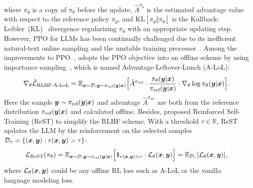 \documentclass{article}
\theoremstyle{plain}
\theoremstyle{definition}
\theoremstyle{remark}
\begin{document}
where $\pi_{\bar{\theta}}$ is a copy of $\pi_\theta$ before the update, $\hat{A}^{\pi_{\bar{\theta}}}$ is the estimated advantage value~\citep{schulman2015high} with respect to the reference policy $\pi_{\bar{\theta}}$, and $\text{KL}[\pi_{\bar{\theta}}\Vert \pi_{\theta}]$ is the Kullback-Leibler~(KL)~\citep{kullback1997information} divergence regularizing $\pi_\theta$ with an appropriate updating step.
However,  PPO for LLMs has been continually challenged due to its inefficient natural-text online sampling and the unstable training processes~\citep{baheti2023improving}. Among the improvements to PPO~\citep{rafailov2023direct,yuan2023rrhf,dong2023raft}, \citet{baheti2023improving} adopts the PPO objective into an offline scheme by using importance sampling~\citep{neal2001annealed}, which is named Advantage-Leftover-Lunch (A-LoL): 
\begin{equation}
  \nabla_\theta \hat{{\mathcal{L}}}_\text{RLHF-A-LoL} =   {\mathbb{E}}_{{\bm{x}} \sim{\mathcal{D}}, {\bm{y}}\sim \pi_\text{ref}({\bm{y}}|{\bm{x}})} \Big[
    \hat{A}^{\pi_\text{ref}}\cdot \frac{\pi_\theta({\bm{y}}|{\bm{x}})}{\pi_\text{ref}({\bm{y}}|{\bm{x}})} \cdot \nabla_\theta \log  \pi_\theta({\bm{y}}|{\bm{x}})  \Big].
\end{equation}
Here the sample ${\bm{y}} \sim \pi_\text{ref}({\bm{y}}|{\bm{x}})$ and advantage $\hat{A}^{\pi_\text{ref}}$ are both from the reference distribution $\pi_\text{ref}({\bm{y}}|{\bm{x}})$ and calculated offline. Besides, \citet{gulcehre2023reinforced} proposed Reinforced Self-Training (ReST) to simplify the RLHF scheme. With a threshold $\tau \in \mathbb{R}$, ReST updates the LLM by the reinforcement on the selected samples ${\mathcal{D}}_\tau = \{({\bm{x}},{\bm{y}}) : r({\bm{x}},{\bm{y}}) >\tau \}$:
\begin{equation}\label{eq:obj-rest}
    {\mathcal{L}}_\text{ReST}(\pi_\theta) = {\mathbb{E}}_{{\bm{x}}\sim {\mathcal{D}}, {\bm{y}}\sim\pi_\text{ref}({\bm{y}}|{\bm{x}})} \Big[\bm{1}_{r({\bm{x}},{\bm{y}}) > \tau} \cdot {\mathcal{L}}_\theta({\bm{x}},{\bm{y}}) \Big] = {\mathbb{E}}_{{\mathcal{D}}_\tau}[{\mathcal{L}}_\theta({\bm{x}},{\bm{y}})],
\end{equation}
where ${\mathcal{L}}_\theta({\bm{x}},{\bm{y}})$ could be any offline RL loss such as A-LoL or the vanilla language modeling loss.



\end{document}

